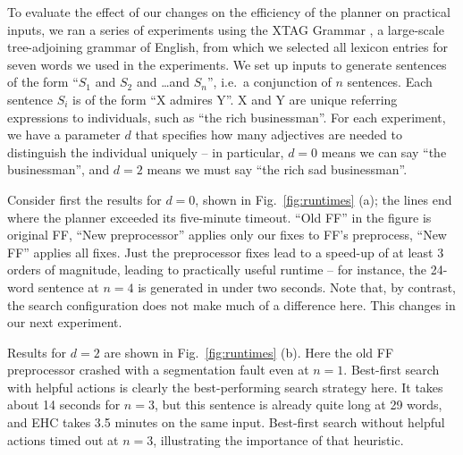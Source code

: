To evaluate the effect of our changes on the efficiency of the planner
on practical inputs, we ran a series of experiments using the XTAG
Grammar \cite{xtag01:_tr}, a large-scale tree-adjoining grammar of
English, from which we selected all lexicon entries for seven words we
used in the experiments. We set up inputs to generate sentences of the
form ``$S_1$ and $S_2$ and \ldots and $S_n$'', i.e.\ a conjunction of
$n$ sentences. Each sentence $S_i$ is of the form ``X admires Y''. X
and Y are unique referring expressions to individuals, such as ``the
rich businessman''. For each experiment, we have a parameter $d$ that
specifies how many adjectives are needed to distinguish the individual
uniquely -- in particular, $d=0$ means we can say ``the businessman'',
and $d=2$ means we must say ``the rich sad businessman''. 
%



Consider first the results for $d=0$, shown in Fig.~\ref{fig:runtimes}
(a); the lines end where the planner exceeded its five-minute timeout.
``Old FF'' in the figure is original FF, ``New preprocessor'' applies
only our fixes to FF's preprocess, ``New FF'' applies all fixes.
Just the preprocessor fixes lead to a speed-up of at least $3$ orders
of magnitude, leading to practically useful runtime -- for instance,
the 24-word sentence at $n=4$ is generated in under two seconds. Note
that, by contrast, the search configuration does not make much of a
difference here. This changes in our next experiment.

Results for $d=2$ are shown in Fig.~\ref{fig:runtimes} (b).  Here the
old FF preprocessor crashed with a segmentation fault even at
$n=1$. Best-first search with helpful actions is clearly the
best-performing search strategy here.  It takes about 14 seconds for
$n=3$, but this sentence is already quite long at 29 words, and EHC
takes 3.5 minutes on the same input.  Best-first search without
helpful actions timed out at $n=3$, illustrating the importance of
that heuristic.

